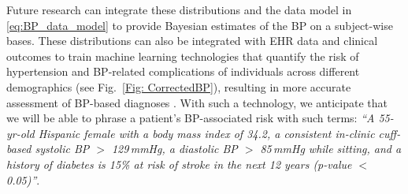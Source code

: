 \documentclass[journal,article,moreauthors]{Definitions/mdpi}
\begin{document}
Future research can integrate these distributions and the data model in \eqref{eq:BP_data_model} to provide Bayesian estimates of the BP on a subject-wise bases. These distributions can also be integrated with EHR data and clinical outcomes to train machine learning technologies that quantify the risk of hypertension and BP-related complications of individuals across different demographics (see Fig.~\ref{Fig: CorrectedBP}), resulting in more accurate assessment of BP-based diagnoses \citep{Praveen2018}. With such a technology, we anticipate that we will be able to phrase a patient's BP-associated risk with such terms: \textit{``A 55-yr-old Hispanic female with a body mass index of 34.2, a consistent in-clinic cuff-based systolic BP $>$ 129\,mmHg, a diastolic BP $>$ 85\,mmHg while sitting, and a history of diabetes is 15\% at risk of stroke in the next 12 years (p-value $<$ 0.05)''}.


\end{document}
